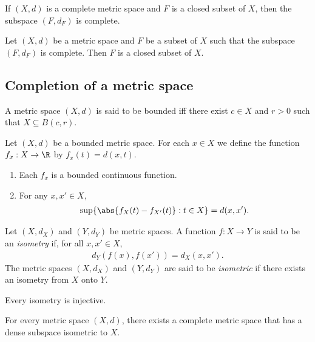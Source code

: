 \documentclass{article}
\begin{document}
\begin{proposition}[7.10]
	If $(X,d)$ is a complete metric space and $F$ is a closed subset of $X$, then
	the subspace $(F,d_F)$ is complete.
\end{proposition}

\begin{proposition}[7.11]
	Let $(X,d)$ be a metric space and $F$ be a subset of $X$ such that the subspace $(F,d_F)$
	is complete. Then $F$ is a closed subset of $X$.
\end{proposition}

\subsection{Completion of a metric space}

\begin{definition}
	A metric space $(X,d)$ is said to be bounded iff there exist  $c\in X$
	and $r>0$ such that $X\subseteq B(c,r)$.
\end{definition}

\begin{proposition}[7.14]
	Let $(X,d)$ be a bounded metric space. For each $x\in X$ we define the function
	$f_x:X\to\R$ by $f_x(t)=d(x,t)$.
	\begin{enumerate}
		\item Each $f_x$ is a bounded continuous function.
		\item For any $x,x'\in X$, \begin{align*}
			      \sup\{\abs{f_X(t)-f_{X'}(t)}:t\in X\}=d(x,x').
		      \end{align*}
	\end{enumerate}
\end{proposition}

\begin{definition}
	Let $(X,d_X)$ and $(Y,d_Y)$ be metric spaces. A function $f:X\to Y$ is said to be
	an \emph{isometry} if, for all $x,x'\in X$,
	\begin{align*}
		d_Y(f(x),f(x')) = d_X(x,x').
	\end{align*}
	The metric spaces $(X,d_X)$ and $(Y,d_Y)$ are said to be \emph{isometric}
	if there exists an isometry from $X$ onto $Y$.
\end{definition}

\begin{corollary}
	Every isometry is injective.
\end{corollary}

\begin{proposition}[7.16]
	For every metric space $(X,d)$, there exists a complete metric space that has a dense subspace
	isometric to $X$.
\end{proposition}
\end{document}
